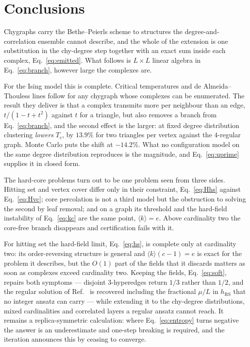 \documentclass[aps,pre,twocolumn,superscriptaddress,floatfix]{revtex4-2}
\newcommand{\ave}[1]{\langle #1 \rangle}
\begin{document}
\section{Conclusions}
\label{sec:conclusions}

Chygraphs carry the Bethe--Peierls scheme to structures the degree-and-correlation
ensemble cannot describe, and the whole of the extension is one substitution in
the chy-degree step together with an exact sum inside each complex,
Eq.~\eqref{eq:emitted}. What follows is $L\times L$ linear algebra in
Eq.~\eqref{eq:branch}, however large the complexes are.

For the Ising model this is complete. Critical temperatures and de
Almeida--Thouless lines follow for any chygraph whose complexes can be
enumerated. The result they deliver is that a complex transmits more per
neighbour than an edge, $t/(1-t+t^2)$ against $t$ for a triangle, but also
removes a branch from Eq.~\eqref{eq:branch}, and the second effect is the
larger: at fixed degree distribution clustering \emph{lowers} $T_c$, by $13.9\%$
for two triangles per vertex against the $4$-regular graph. Monte Carlo puts the
shift at $-14.2\%$. What no configuration model on the same degree distribution
reproduces is the magnitude, and Eq.~\eqref{eq:uprime} supplies it in closed
form.

The hard-core problems turn out to be one problem seen from three sides. Hitting
set and vertex cover differ only in their constraint, Eq.~\eqref{eq:Hhs} against
Eq.~\eqref{eq:Hvc}; core percolation is not a third model but the obstruction to
solving the second by leaf removal; and on a graph its threshold and the
hard-field instability of Eq.~\eqref{eq:kc} are the same point, $\ave{k}=e$.
Above cardinality two the core-free branch disappears and certification fails
with it.

For hitting set the hard-field limit, Eq.~\eqref{eq:hs}, is complete only at
cardinality two: its order-reversing structure is general and $\ave{k}(c-1)=e$
is exact for the problem it describes, but the $O(1)$ part of the fields that it
discards matters as soon as complexes exceed cardinality two. Keeping the fields,
Eq.~\eqref{eq:soft}, repairs both symptoms --- disjoint $3$-hyperedges return
$1/3$ rather than $1/2$, and the regular solution of Ref.~\cite{MT07} is
recovered including the fractional $\mu/L$ in $h_{\mathrm{RS}}$ that no integer
ansatz can carry --- while extending it to the chy-degree distributions, mixed
cardinalities and correlated layers a regular ansatz cannot reach. It remains a
replica-symmetric calculation: where Eq.~\eqref{eq:entropy} turns negative the
answer is an underestimate and one-step breaking is required, and the iteration
announces this by ceasing to converge.
\end{document}
